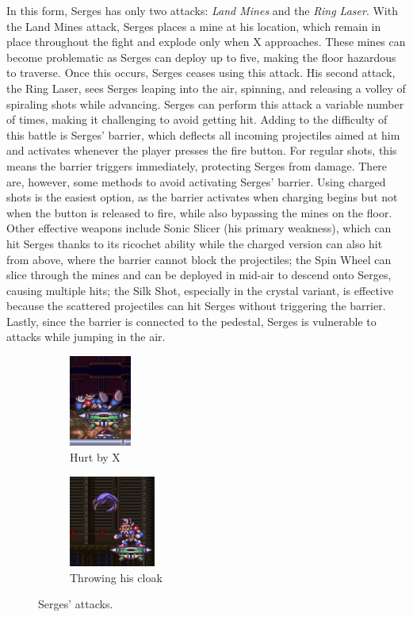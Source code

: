 In this form, Serges has only two attacks: \emph{Land Mines} and the \emph{Ring Laser}. With the Land Mines attack, Serges places a mine at his location, which remain in place throughout the fight and explode only when X approaches. These mines can become problematic as Serges can deploy up to five, making the floor hazardous to traverse. Once this occurs, Serges ceases using this attack. His second attack, the Ring Laser, sees Serges leaping into the air, spinning, and releasing a volley of spiraling shots while advancing. Serges can perform this attack a variable number of times, making it challenging to avoid getting hit. Adding to the difficulty of this battle is Serges' barrier, which deflects all incoming projectiles aimed at him and activates whenever the player presses the fire button. For regular shots, this means the barrier triggers immediately, protecting Serges from damage. There are, however, some methods to avoid activating Serges' barrier. Using charged shots is the easiest option, as the barrier activates when charging begins but not when the button is released to fire, while also bypassing the mines on the floor. Other effective weapons include Sonic Slicer (his primary weakness), which can hit Serges thanks to its ricochet ability while the charged version can also hit from above, where the barrier cannot block the projectiles; the Spin Wheel can slice through the mines and can be deployed in mid-air to descend onto Serges, causing multiple hits; the Silk Shot, especially in the crystal variant, is effective because the scattered projectiles can hit Serges without triggering the barrier. Lastly, since the barrier is connected to the pedestal, Serges is vulnerable to attacks while jumping in the air.

\begin{figure}[htp]
	\centering
	\ContinuedFloat
	\begin{subfigure}{0.25\linewidth}
		\centering
		\includegraphics[height=3cm]{figures/X2/Hunter_stages/Serges_hurt.png}
		\caption{Hurt by X}
	\end{subfigure}
	\begin{subfigure}{0.3\linewidth}
		\centering
		\includegraphics[height=3cm]{figures/X2/Hunter_stages/Serges_cloak.jpg}
		\caption{Throwing his cloak}
	\end{subfigure}
	\caption{Serges' attacks.}	
\end{figure}


